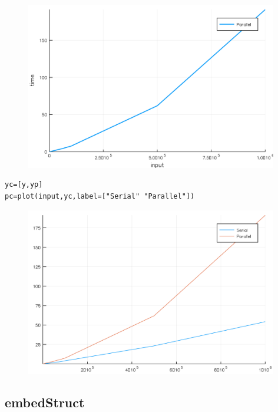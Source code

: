 \documentclass[a4paper,12pt]{article}
\begin{document}
\begin{figure}[ht!]
\centering
\includegraphics[width=11cm,scale=0.3]{pembedtraversal.png}
\end{figure}
\begin{verbatim}
yc=[y,yp]
pc=plot(input,yc,label=["Serial" "Parallel"])
\end{verbatim}
\begin{figure}[ht!]
\centering
\includegraphics[width=11cm,scale=0.5]{compembedtraversal.png}
\end{figure}
\newpage
\subsection{embedStruct}
\end{document}
